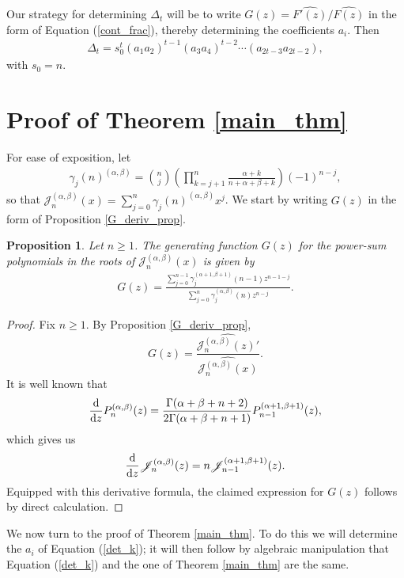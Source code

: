 \documentclass{amsart}
\theoremstyle{plain}
\newtheorem{prop}[equation]{Proposition}
\theoremstyle{remark}
\begin{document}
Our strategy for determining $\Delta_t$ will be to write $G(z) = {\widehat{F'(z)}}/{\widehat{F(z)}}$ in the form of Equation (\ref{cont_frac}), thereby determining the coefficients $a_i$. Then
\begin{align} \label{det_k}
\Delta_{t} = s_0^t \left( a_1a_2 \right)^{t-1}\left(a_3a_4 \right)^{t-2} \cdots \left(a_{2t-3}a_{2t-2}\right),
\end{align}
with $s_0=n$.

\section{Proof of Theorem \ref{main_thm}}

For ease of exposition, let 
\begin{align} \label{gamma_defn}
\gamma_j(n)^{(\alpha,\beta)} = \binom{n}{j} \left( \prod_{k=j+1}^n \frac{\alpha + k}{n+\alpha + \beta + k} \right) (-1)^{n-j},
\end{align}
so that $\mathscr{J}_n^{(\alpha,\beta)}(x) = \sum_{j=0}^n\gamma_j(n)^{(\alpha,\beta)}x^j$. We start by writing $G(z)$ in the form of Proposition \ref{G_deriv_prop}.  


\begin{prop}\label{gen_function}
Let $n \geq 1$.  The generating function $G(z)$ for the power-sum polynomials in the roots of $\mathscr{J}_n^{(\alpha,\beta)}(x)$ is given by
\begin{align}  \label{F_eq_original}
G(z) =\frac{\sum_{j=0}^{n-1} \gamma_j^{(\alpha+1,\beta+1)}(n-1)z^{n-1-j}}{\sum_{j=0}^n \gamma_j^{(\alpha,\beta)}(n)z^{n-j}}.
\end{align}
\end{prop}

\begin{proof}
Fix $n \geq 1$.  By Proposition \ref{G_deriv_prop}, 
\[
G(z) = \frac{ \widehat{ \mathscr{J}_n^{(\alpha,\beta)}(z)'}}{\widehat{ \mathscr{J}_n^{(\alpha,\beta)}(x)}}.
\]
It is well known that
\[
\frac{{\rm d}}{{\rm d}z} P_n^{(\alpha,\beta)}(z) = \frac{\Gamma(\alpha+\beta+n+2)}{2\Gamma(\alpha+\beta+n+1)} P_{n-1}^{(\alpha+1,\beta+1)}(z),
\]
which gives us
\[
\frac{{\rm d}}{{\rm d}z} \mathscr{J}_n^{(\alpha,\beta)}(z) = n \mathscr{J}_{n-1}^{(\alpha + 1,\beta+1)}(z).
\]
Equipped with this derivative formula, the claimed expression for $G(z)$ follows by direct calculation. 
\end{proof}

We now turn to the proof of Theorem \ref{main_thm}.  To do this we will determine the $a_i$ of Equation (\ref{det_k}); it will then follow by algebraic manipulation that Equation (\ref{det_k}) and the one of Theorem \ref{main_thm} are the same.
\end{document}

